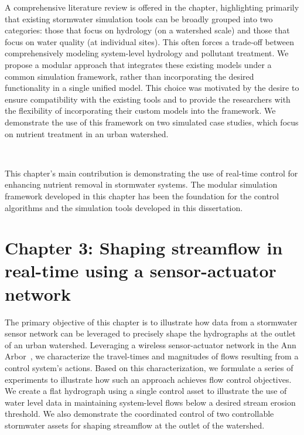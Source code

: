 A comprehensive literature review is offered in the chapter, highlighting primarily that existing stormwater simulation tools can be broadly grouped into two categories: those that focus on hydrology (on a watershed scale)\cite{Rossman2010Storm5.1} and those that focus on water quality (at individual sites)\cite{Langergraber2009CWM1:Wetlands}.
This often forces a trade-off between comprehensively modeling system-level hydrology and pollutant treatment.
We propose a modular approach that integrates these existing models under a common simulation framework, rather than incorporating the desired functionality in a single unified model.
This choice was motivated by the desire to ensure compatibility with the existing tools and to provide the researchers with the flexibility of incorporating their custom models into the framework.
We demonstrate the use of this framework on two simulated case studies, which focus on nutrient treatment in an urban watershed.

\

This chapter's main contribution is demonstrating the use of real-time control for enhancing nutrient removal in stormwater systems.
The modular simulation framework developed in this chapter has been the foundation for the control algorithms and the simulation tools developed in this dissertation. 

\section{Chapter 3: Shaping streamflow in real-time using a sensor-actuator network}

The primary objective of this chapter is to illustrate how data from a stormwater sensor network can be leveraged to precisely shape the hydrographs at the outlet of an urban watershed.
Leveraging a wireless sensor-actuator network in the Ann Arbor~\cite{Bartos_2018}, we characterize the travel-times and magnitudes of flows resulting from a control system's actions.
Based on this characterization, we formulate a series of experiments to illustrate how such an approach achieves flow control objectives.
We create a flat hydrograph using a single control asset to illustrate the use of water level data in maintaining system-level flows below a desired stream erosion threshold.
We also demonstrate the coordinated control of two controllable stormwater assets for shaping streamflow at the outlet of the watershed.

\

